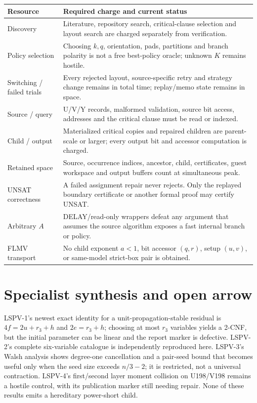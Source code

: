 \documentclass[11pt]{article}
\begin{document}
\begin{longtable}{p{.22\linewidth}p{.70\linewidth}}
\toprule
Resource & Required charge and current status\\
\midrule
Discovery & Literature, repository search, critical-clause selection and
layout search are charged separately from verification.\\
Policy selection & Choosing $k,q$, orientation, pads, partitions and branch
polarity is not a free best-policy oracle; unknown $K$ remains hostile.\\
Switching / failed trials & Every rejected layout, source-specific retry and
strategy change remains in total time; replay/memo state remains in space.\\
Source / query & U/V/Y records, malformed validation, source bit access,
addresses and the critical clause must be read or indexed.\\
Child / output & Materialized critical copies and repaired children are
parent-scale or larger; every output bit and accessor computation is charged.\\
Retained space & Source, occurrence indices, ancestor, child, certificates,
guest workspace and output buffers count at simultaneous peak.\\
UNSAT correctness & A failed assignment repair never rejects.  Only the
replayed boundary certificate or another formal proof may certify UNSAT.\\
Arbitrary $A$ & DELAY/read-only wrappers defeat any argument that assumes the
source algorithm exposes a fast internal branch or policy.\\
FLMV transport & No child exponent $a<1$, bit accessor $(q,r)$, setup $(u,v)$,
or same-model strict-box pair is obtained.\\
\bottomrule
\end{longtable}

\section{Specialist synthesis and open arrow}

LSPV-1's newest exact identity for a unit-propagation-stable residual is
$4f=2u+r_3+h$ and $2e=r_3+h$; choosing at most $r_3$ variables yields a 2-CNF,
but the initial parameter can be linear and the report marker is defective.
LSPV-2's complete six-variable catalogue is independently reproduced here.
LSPV-3's Walsh analysis shows degree-one cancellation and a pair-seed bound
that becomes useful only when the seed size exceeds $n/3-2$; it is restricted,
not a universal contraction.  LSPV-4's first/second layer moment collision on
U198/V198 remains a hostile control, with its publication marker still needing
repair.  None of these results emits a hereditary power-short child.
\end{document}
